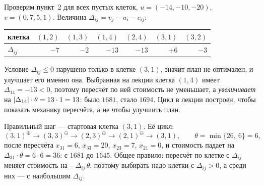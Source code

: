 \begin{idea}[title={Что здесь на самом деле произошло}]
Проверим пункт~2 для всех пустых клеток, $u = (-14, -10, -20)$,
$v = (0, 7, 5, 1)$. Величина $\Delta_{ij} = v_j - u_i - c_{ij}$:
\begin{center}
\begin{tabular}{lrrrrrr}
\toprule
клетка & $(1,2)$ & $(1,3)$ & $(1,4)$ & $(2,4)$ & $(3,1)$ & $(3,2)$ \\
\midrule
$\Delta_{ij}$ & $-7$ & $-2$ & $-13$ & $-13$ & $+6$ & $-3$ \\
\bottomrule
\end{tabular}
\end{center}
Условие $\Delta_{ij} \le 0$ нарушено только в клетке $(3,1)$, значит план не
оптимален, и улучшает его именно она. Выбранная на лекции клетка $(1,4)$ имеет
$\Delta_{14} = -13 < 0$, поэтому пересчёт по ней стоимость не уменьшает, а
\emph{увеличивает} на $\left\lvert \Delta_{14} \right\rvert\cdot\theta = 13 \cdot 1 = 13$:
было $1681$, стало $1694$. Цикл в лекции построен, чтобы показать механику
пересчёта, а не чтобы улучшить план.

Правильный шаг — стартовая клетка $(3,1)$. Её цикл:
\[
  (3,1)^{\oplus} \to (3,3)^{\ominus} \to (2,3)^{\oplus} \to (2,1)^{\ominus}
  \to (3,1) , \qquad \theta = \min\{26,\ 6\} = 6 ,
\]
после пересчёта $x_{31} = 6$, $x_{33} = 20$, $x_{23} = 7$, $x_{21} = 0$, и
стоимость падает на $\Delta_{31}\cdot\theta = 6 \cdot 6 = 36$: с $1681$ до $1645$.
Общее правило: пересчёт по клетке с $\Delta_{ij}$ меняет стоимость на
$-\Delta_{ij}\,\theta$, поэтому выбирать надо клетки с $\Delta_{ij} > 0$, а среди
них — с наибольшим $\Delta_{ij}$.
\end{idea}
